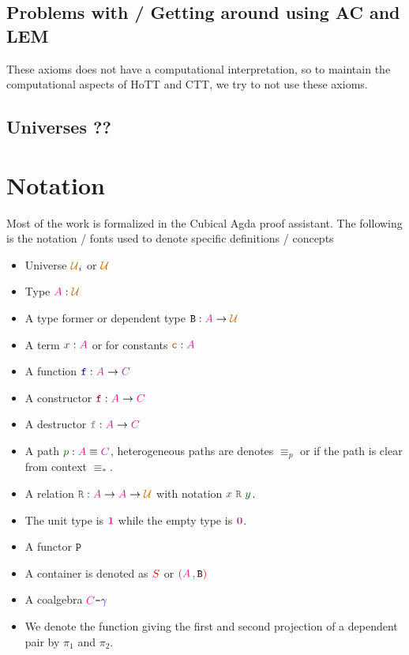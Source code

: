 \documentclass[twoside,11pt,openright]{report}
\theoremstyle{plain} %
\theoremstyle{definition}
\theoremstyle{remark}
\newcommand*{\term}[1]{\textcolor{green!30!black}{#1}} %
\newcommand*{\pathterm}[1]{\textcolor{green!40!black}{#1}}
\newcommand*{\type}[1]{\textcolor{magenta!90!black}{#1}}
\newcommand*{\container}[1]{\textcolor{red}{#1}}
\newcommand*{\containerpair}[2]{\ensuremath{\colorlet{savedleftcolor}{.}\color{red}\left(\color{savedleftcolor}#1\,\textcolor{red}{\mathbf{,}}\,#2\color{red}\right)\color{savedleftcolor}}}
\newcommand*{\universe}[1]{\textcolor{orange!80!black}{#1}}
\newcommand*{\unit}{\type{\textbf{1}}}
\newcommand*{\empt}{\type{\textbf{0}}}
\newcommand*{\coalg}[2]{#1\texttt{-}#2}
\newcommand*{\relation}[1]{\textcolor{gray!75!black}{\ensuremath{\mathtt{#1}}}}
\newcommand*{\constant}[1]{\textcolor{orange!60!black}{\ensuremath{\mathtt{#1}}}}
\newcommand*{\function}[1]{\textcolor{blue!60!black}{\ensuremath{\mathtt{#1}}}}
\newcommand*{\constructor}[1]{\textcolor{purple!60!black}{\ensuremath{\mathtt{#1}}}}
\newcommand*{\destructor}[1]{\textcolor{pink!60!black}{\ensuremath{\mathtt{#1}}}}
\newcommand*{\typeformer}[1]{\ensuremath{\mathtt{#1}}}
\newcommand*{\functor}[1]{\ensuremath{\mathbf{\mathtt{#1}}}}
\begin{document}
\subsection{Problems with / Getting around using AC and LEM}
These axioms does not have a computational interpretation, so to maintain the computational aspects of HoTT and CTT, we try to not use these axioms. \cite[Introduction]{hottbook}

\subsection{Universes ??}

\section{Notation}
Most of the work is formalized in the Cubical Agda proof assistant. The following is the notation / fonts used to denote specific definitions / concepts
\begin{itemize}
\item Universe \(\universe{\mathcal{U}}_i\) or \(\universe{\mathcal{U}}\)
\item Type \(\type{A} : \universe{\mathcal{U}}\)
\item A type former or dependent type \(\typeformer{B} : \type{A} \rightarrow \universe{\mathcal{U}}\)
\item A term \(\term{x} : \type{A}\) or for constants \(\constant{c} : \type{A}\)
\item A function \(\function{f} : \type{A} \rightarrow \type{C}\)
\item A constructor \(\constructor{f} : \type{A} \rightarrow \type{C}\) 
\item A destructor \(\destructor{f} : \type{A} \rightarrow \type{C}\) 
\item A path \(\pathterm{p} : \type{A} \equiv \type{C}\), heterogeneous paths are denotes \(\equiv_p\) or if the path is clear from context \(\equiv_*\).
\item A relation \(\relation{R} : \type{A} \rightarrow \type{A} \rightarrow \universe{\mathcal{U}}\) with notation \(\term{x}~\relation{R}~\term{y}\).
\item The unit type is \(\unit\) while the empty type is \(\empt\).
\item A functor \(\functor{P}\)
\item A container is denoted as \(\container{S}\) or \(\containerpair{\type{A}}{\typeformer{B}}\)
\item A coalgebra \(\coalg{\type{C}}{\function{\gamma}}\)
\item We denote the function giving the first and second projection of a dependent pair by \(\pi_1\) and \(\pi_2\).
\end{itemize}
\end{document}
